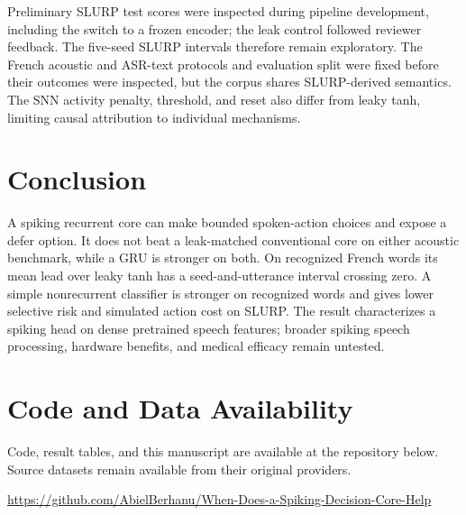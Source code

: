 \documentclass[conference]{IEEEtran}
\begin{document}
Preliminary SLURP test scores were inspected during pipeline development, including the switch to a frozen encoder; the leak control followed reviewer feedback. The five-seed SLURP intervals therefore remain exploratory. The French acoustic and ASR-text protocols and evaluation split were fixed before their outcomes were inspected, but the corpus shares SLURP-derived semantics. The SNN activity penalty, threshold, and reset also differ from leaky tanh, limiting causal attribution to individual mechanisms.

\section{Conclusion}
A spiking recurrent core can make bounded spoken-action choices and expose a defer option. It does not beat a leak-matched conventional core on either acoustic benchmark, while a GRU is stronger on both. On recognized French words its mean lead over leaky tanh has a seed-and-utterance interval crossing zero. A simple nonrecurrent classifier is stronger on recognized words and gives lower selective risk and simulated action cost on SLURP. The result characterizes a spiking head on dense pretrained speech features; broader spiking speech processing, hardware benefits, and medical efficacy remain untested.

\section*{Code and Data Availability}
Code, result tables, and this manuscript are available at the repository below. Source datasets remain available from their original providers.
\begin{flushleft}
\url{https://github.com/AbielBerhanu/When-Does-a-Spiking-Decision-Core-Help}
\end{flushleft}
\end{document}

